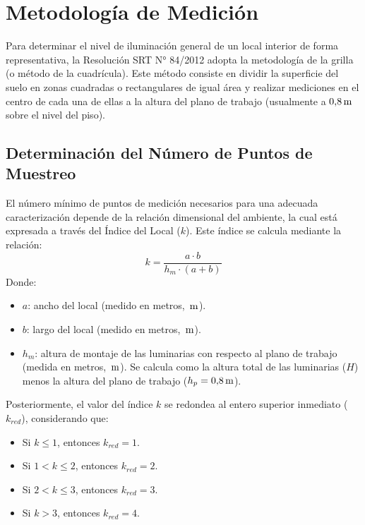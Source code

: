 \chapter{Metodología de Medición}
\label{sec.tp2:metodologia}

Para determinar el nivel de iluminación general de un local interior de forma representativa, la Resolución SRT N°
84/2012 adopta la metodología de la grilla (o método de la cuadrícula). Este método consiste en dividir la superficie
del suelo en zonas cuadradas o rectangulares de igual área y realizar mediciones en el centro de cada una de ellas a la
altura del plano de trabajo (usualmente a $0{,}8\,\mathrm{m}$ sobre el nivel del piso).

\section{Determinación del Número de Puntos de Muestreo}
\label{sec.tp2:determinacion_puntos}

El número mínimo de puntos de medición necesarios para una adecuada caracterización depende de la relación dimensional del
ambiente, la cual está expresada a través del Índice del Local ($k$). Este índice se calcula mediante la relación:
\begin{equation}
    k = \frac{a \cdot b}{h_m \cdot (a + b)}
    \label{eq.tp2:indice_k}
\end{equation}
Donde:
\begin{itemize}
    \item $a$: ancho del local (medido en metros, $\,\mathrm{m}$).
    \item $b$: largo del local (medido en metros, $\,\mathrm{m}$).
    \item $h_m$: altura de montaje de las luminarias con respecto al plano de trabajo (medida en metros, $\,\mathrm{m}$). Se calcula como la altura total de las luminarias ($H$) menos la altura del plano de trabajo ($h_p = 0{,}8\,\mathrm{m}$).
\end{itemize}

Posteriormente, el valor del índice $k$ se redondea al entero superior inmediato ($k_{red}$), considerando que:
\begin{itemize}
    \item Si $k \le 1$, entonces $k_{red} = 1$.
    \item Si $1 < k \le 2$, entonces $k_{red} = 2$.
    \item Si $2 < k \le 3$, entonces $k_{red} = 3$.
    \item Si $k > 3$, entonces $k_{red} = 4$.
\end{itemize}

